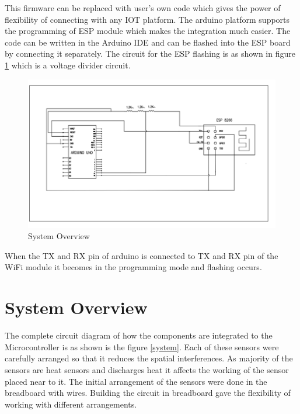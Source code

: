  This firmware can be replaced with user's own code which gives the power of flexibility of connecting with any IOT platform. The arduino platform supports the programming of ESP module which makes the integration much easier. The code can be written in the Arduino IDE and can be flashed into the ESP board by connecting it separately.
 The circuit for the ESP flashing is as shown in figure \ref{cir} which is a voltage divider circuit.

 \begin{figure}[h]
  \begin{center}
  \includegraphics[scale=0.95]{./images/figure11.png}
  \end{center}
  \caption{System Overview}
  \label{cir}
\end{figure}





 When the TX and RX pin of arduino is connected to TX and RX pin of the WiFi module it becomes in the programming mode and flashing occurs. 
 
 \section{System Overview}
The complete circuit diagram of how the components are integrated to the Microcontroller is as shown is the figure \ref{system}. Each of these sensors were carefully arranged so that it reduces the spatial interferences. As majority of the sensors are heat sensors and discharges heat it affects the working of the sensor placed near to it. The initial arrangement of the sensors were done in the breadboard with wires. Building the circuit in breadboard gave the flexibility of working with different arrangements.

